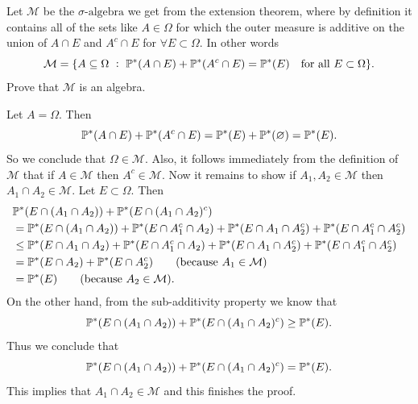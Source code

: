 \begin{problem}
	Let $ \mathcal{M} $ be the $ \sigma\text{-algebra} $ we get from the extension theorem, where by definition it contains all of the sets like $ A \in \Omega $ for which the outer measure is additive on the union of $ A \cap E $ and $ A^c \cap E $ for $ \forall E \subset \Omega  $. In other words
	\[ \mathcal{M} = \{A \subseteq \Omega\ :\ \mathbb{P}^*(A\cap E) + \mathbb{P}^*(A^c \cap E) = \mathbb{P}^*(E) \quad \text{for all } E \subset \Omega\}. \]
	Prove that $ \mathcal{M} $ is an algebra.
\end{problem}
\begin{solution}
	Let $ A = \Omega $. Then
	\[ \mathbb{P}^*(A \cap E) + \mathbb{P}^*(A^c\cap E) = \mathbb{P}^*(E) + \mathbb{P}^*(\varnothing) = \mathbb{P}^*(E). \]
	So we conclude that $ \Omega \in \mathcal{M} $. Also, it follows immediately from the definition of $ \mathcal{M} $ that if $ A \in \mathcal{M} $ then $ A^c \in \mathcal{M} $. Now it remains to show if $ A_1, A_2 \in \mathcal{M} $ then $ A_1\cap A_2 \in \mathcal{M} $. Let $ E \subset \Omega $. Then 
	\begin{align*}
		&\mathbb{P}^*(E \cap (A_1 \cap A_2)) + \mathbb{P}^*(E \cap (A_1 \cap A_2)^c ) \\
		&= \mathbb{P}^*(E\cap (A_1\cap A_2)) + \mathbb{P}^*(E\cap A_1^c \cap A_2) + \mathbb{P}^*(E\cap A_1 \cap A_2^c) + \mathbb{P}^*(E\cap A_1^c \cap A_2^c) \\
		&\leq \mathbb{P}^*(E\cap A_1\cap A_2) + \mathbb{P}^*(E \cap A_1^c \cap A_2) + \mathbb{P}^*(E \cap A_1 \cap A_2^c) + \mathbb{P}^*(E\cap A_1^c \cap A_2^c)\\
		&=\mathbb{P}^*(E\cap A_2) + \mathbb{P}^*(E\cap A_2^c) \qquad \text{(because $ A_1 \in \mathcal{M} $)} \\
		&=\mathbb{P}^*(E) \qquad \text{(because $ A_2 \in \mathcal{M} $)}.
	\end{align*}
	On the other hand, from the sub-additivity property we know that 
	\[ \mathbb{P}^*(E\cap (A_1\cap A_2)) + \mathbb{P}^*(E \cap (A_1\cap A_2)^c) \geq \mathbb{P}^*(E). \]
	Thus we conclude that 
	\[ \mathbb{P}^*(E\cap (A_1\cap A_2)) + \mathbb{P}^*(E\cap (A_1\cap A_2)^c) = \mathbb{P}^*(E). \]
	This implies that $ A_1\cap A_2 \in \mathcal{M} $ and this finishes the proof.
\end{solution}


